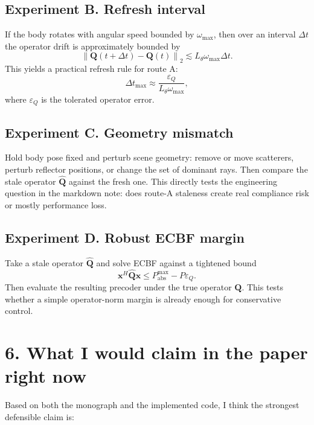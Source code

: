 \documentclass[11pt]{article}
\newcommand{\QQ}{\mathbf{Q}}
\newcommand{\x}{\mathbf{x}}
\newcommand{\norm}[1]{\left\lVert #1 \right\rVert}
\begin{document}
\subsection*{Experiment B. Refresh interval}

If the body rotates with angular speed bounded by $\omega_{\max}$, then over
an interval $\Delta t$ the operator drift is approximately bounded by
\begin{equation}
  \norm{\QQ(t+\Delta t)-\QQ(t)}_2
  \lesssim L_\theta \omega_{\max}\Delta t.
\end{equation}
This yields a practical refresh rule for route A:
\begin{equation}
  \Delta t_{\max}
  \approx \frac{\varepsilon_Q}{L_\theta \omega_{\max}},
\end{equation}
where $\varepsilon_Q$ is the tolerated operator error.

\subsection*{Experiment C. Geometry mismatch}

Hold body pose fixed and perturb scene geometry: remove or move scatterers,
perturb reflector positions, or change the set of dominant rays. Then compare
the stale operator $\widehat{\QQ}$ against the fresh one. This directly tests
the engineering question in the markdown note: does route-A staleness create
real compliance risk or mostly performance loss.

\subsection*{Experiment D. Robust ECBF margin}

Take a stale operator $\widehat{\QQ}$ and solve ECBF against a tightened bound
\begin{equation}
  \x^H\widehat{\QQ}\x \le P_{\mathrm{abs}}^{\max} - P\varepsilon_Q.
\end{equation}
Then evaluate the resulting precoder under the true operator $\QQ$. This tests
whether a simple operator-norm margin is already enough for conservative
control.

\section*{6. What I would claim in the paper right now}

Based on both the monograph and the implemented code, I think the strongest
defensible claim is:
\end{document}
